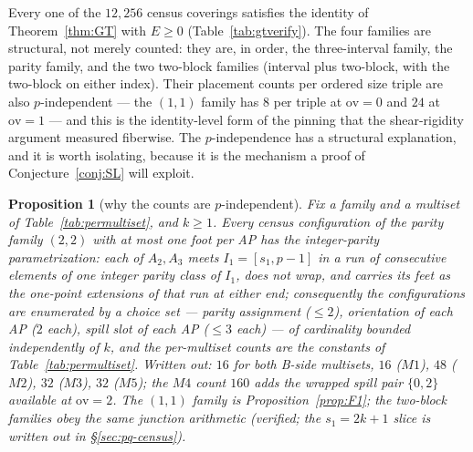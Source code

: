 \documentclass[11pt,a4paper]{article}
\numberwithin{equation}{section}
\theoremstyle{plain}
\newtheorem{proposition}[theorem]{Proposition}
\theoremstyle{definition}
\theoremstyle{remark}
\begin{document}
Every one of the $12{,}256$ census coverings satisfies the identity of
Theorem~\ref{thm:GT} with $E\ge0$ (Table~\ref{tab:gtverify}). The four
families are structural, not merely counted: they are, in order, the
three-interval family, the parity family, and the two two-block families
(interval plus two-block, with the two-block on either index). Their
placement counts per ordered size triple are also $p$-independent --- the
$(1,1)$ family has $8$ per triple at $\mathrm{ov}=0$ and $24$ at
$\mathrm{ov}=1$ --- and this is the identity-level form of the pinning that
the shear-rigidity argument measured fiberwise. The $p$-independence has a
structural explanation, and it is worth isolating, because it is the
mechanism a proof of Conjecture~\ref{conj:SL} will exploit.

\begin{proposition}[why the counts are $p$-independent]\label{prop:pindep}
Fix a family and a multiset of Table~\ref{tab:permultiset}, and $k\ge1$.
Every census configuration of the parity family $(2,2)$ with at most one
foot per AP has the \emph{integer-parity parametrization}: each of $A_2,
A_3$ meets $I_1=[s_1,p-1]$ in a run of consecutive elements of one integer
parity class of $I_1$, does not wrap, and carries its feet as the one-point
extensions of that run at either end; consequently the configurations are
enumerated by a choice set --- parity assignment ($\le2$), orientation of
each AP ($2$ each), spill slot of each AP ($\le3$ each) --- of cardinality
bounded independently of $k$, and the per-multiset counts are the constants
of Table~\ref{tab:permultiset}. Written out: $16$ for both B-side
multisets, $16$ ($M1$), $48$ ($M2$), $32$ ($M3$), $32$ ($M5$); the $M4$
count $160$ adds the wrapped spill pair $\{0,2\}$ available at
$\mathrm{ov}=2$. The $(1,1)$ family is Proposition~\ref{prop:F1}; the
two-block families obey the same junction arithmetic (verified; the
$s_1=2k{+}1$ slice is written out in \S\ref{sec:pq-census}).
\end{proposition}
\end{document}

